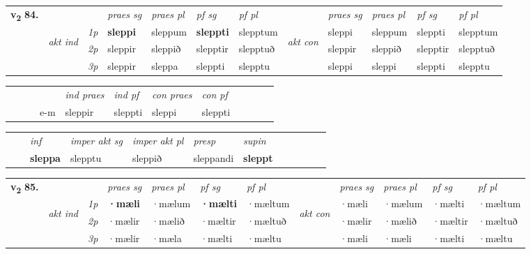 \begin{tabular}{llllllllllll} \toprule
\multirow{4}{*}{{{\textbf{v{\textsubscript{2}}} \Large{\textbf{84.}}}}}  & &   &  \textit{praes sg}  & \textit{praes pl}  &\textit{ pf sg} & \textit{pf pl} &  &  \textit{praes sg}  & \textit{praes pl}  & \textit{pf sg} & \textit{pf pl } \\*
	\cmidrule{4-7} \cmidrule{9-12}
 & \multirow{3}{*}{\begin{turn}{90}\textit{akt ind}\end{turn}} & {\textit{1p}} & \textbf{sleppi} & sleppum    & \textbf{sleppti} & slepptum & \multirow{3}{*}{\begin{turn}{90}\textit{akt con}\end{turn}} &sleppi & sleppum & sleppti & slepptum\\*
& &  {\textit{2p}} &  sleppir  & sleppið   & slepptir & slepptuð & & sleppir & sleppið & slepptir & slepptuð \\*
& &  {\textit{3p}} & sleppir & sleppa   & sleppti & slepptu & & sleppi & sleppi& sleppti & slepptu  \\*
\cmidrule{4-7} \cmidrule{9-12}
\end{tabular}


\begin{tabular}{llllllllllll}
 & &  & &  \textit{ind praes} & \textit{ind pf} & \textit{con praes} & \textit{con pf} \\*
&  & & e-m & sleppir & sleppti & sleppi & sleppti \\*
\cmidrule{5-9}
\end{tabular}


\begin{tabular}{llllllllllll}
 & & \textit{inf} & \textit{imper akt sg} & \textit{imper akt pl}   & \textit{presp} & \textit{supin}       \\*
  & & \textbf{sleppa} & slepptu  & sleppið   & sleppandi &  \textbf{sleppt}   \\*
\cmidrule{1-12}
\end{tabular}



\begin{tabular}{llllllllllll} \toprule
\multirow{4}{*}{{{\textbf{v{\textsubscript{2}}} \Large{\textbf{85.}}}}}  & &   &  \textit{praes sg}  & \textit{praes pl}  &\textit{ pf sg} & \textit{pf pl} &  &  \textit{praes sg}  & \textit{praes pl}  & \textit{pf sg} & \textit{pf pl } \\*
	\cmidrule{4-7} \cmidrule{9-12}
 & \multirow{3}{*}{\begin{turn}{90}\textit{akt ind}\end{turn}} & {\textit{1p}} & \textbf{·mæli} & ·mælum    & \textbf{·mælti} & ·mæltum & \multirow{3}{*}{\begin{turn}{90}\textit{akt con}\end{turn}} &·mæli & ·mælum & ·mælti & ·mæltum\\*
& &  {\textit{2p}} &  ·mælir  & ·mælið   & ·mæltir & ·mæltuð & & ·mælir & ·mælið & ·mæltir & ·mæltuð \\*
& &  {\textit{3p}} & ·mælir & ·mæla   & ·mælti & ·mæltu & & ·mæli & ·mæli& ·mælti & ·mæltu  \\*
\cmidrule{4-7} \cmidrule{9-12}
\end{tabular}


